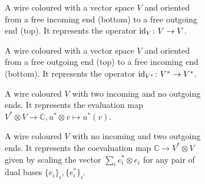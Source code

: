 \documentclass{amsart}
\newcommand{\tn}{\textnormal}
\begin{document}
\begin{figure}
\begin{subfigure}{.8\textwidth}
\caption{A wire coloured with a vector space $V$ and oriented from a free incoming end (bottom) to a free outgoing end (top). It represents the operator $\tn{id}_V\colon V\to V$.}
\end{subfigure}
\begin{subfigure}{.19\textwidth}
\centering
{}
\end{subfigure}
\begin{subfigure}{.8\textwidth}
\caption{A wire coloured with a vector space $V$ and oriented from a free outgoing end (top) to a free incoming end (bottom). It represents the operator $\tn{id}_{V^*}\colon V^*\to V^*$.}
\label{sfig:id_dual}
\end{subfigure}
\begin{subfigure}{.19\textwidth}
\centering
{}
\end{subfigure}
\begin{subfigure}{.8\textwidth}
\caption{A wire coloured $V$ with two incoming and no outgoing ends. It represents the evaluation map $V^*\otimes V\to\mathbb{C},u^*\otimes v\mapsto u^*(v)$.}
\label{sfig:eval}
\end{subfigure}
\begin{subfigure}{.19\textwidth}
\centering
{}
\end{subfigure}
\begin{subfigure}{.8\textwidth}
\caption{A wire coloured $V$ with no incoming and two outgoing ends. It represents the coevaluation map $\mathbb{C}\to V^*\otimes V$ given by scaling the vector $\sum_ie_i^*\otimes e_i$ for any pair of dual bases $\{e_i\}_i,\{e_i^*\}_i$.}
\label{sfig:coeval}
\end{subfigure}
\begin{subfigure}{.19\textwidth}

\end{subfigure}
\end{figure}
\end{document}

